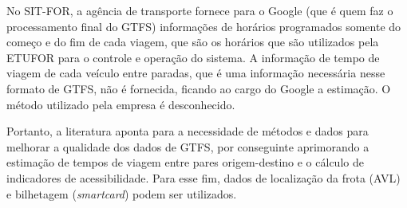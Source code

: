 \documentclass[        
    a4paper,          %
    12pt,             %
    chapter=TITLE,    %
    section=Title,    %
    subsection=Title, %
    oneside,          %
    english,          %
    spanish,          %
    brazil,           %
    fleqn             %
]{abntex2}
\begin{document}
  \begin{figure}[!h]
  \captionsetup{width=16cm}
  \centering
  \end{figure}
  
  No SIT-FOR, a agência de transporte fornece para o Google (que é quem faz o processamento final do GTFS) informações de horários programados somente do começo e do fim de cada viagem, que são os horários que são utilizados pela ETUFOR para o controle e operação do sistema. A informação de tempo de viagem de cada veículo entre paradas, que é uma informação necessária nesse formato de GTFS, não é fornecida, ficando ao cargo do Google a estimação. O método utilizado pela empresa é desconhecido.
  
  Portanto, a literatura aponta para a necessidade de métodos e dados para melhorar a qualidade dos dados de GTFS, por conseguinte aprimorando a estimação de tempos de viagem entre pares origem-destino e o cálculo de indicadores de acessibilidade. Para esse fim, dados de localização da frota (AVL) e bilhetagem (\emph{smartcard}) podem ser utilizados.
  
\end{document}
